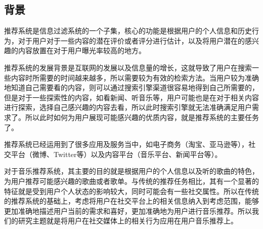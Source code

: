 \subsection{背景}
推荐系统是信息过滤系统的一个子集，核心的功能是根据用户的个人信息和历史行为，对于用户对于一些内容的潜在评价或者评分进行估计，以及将用户潜在的感兴趣的内容放置在对于用户曝光率较高的地方。

推荐系统的发展背景是互联网的发展以及信息量的增长，这就导致了用户在搜索一些内容时所需要的时间越来越多，所以需要较为有效的检索方法。当用户较为准确地知道自己需要看的内容，则可以通过搜索引擎渠道很容易地得到自己所需要的，但是对于一些探索性的内容，如看新闻、听音乐等，用户可能也是在对于相关内容进行探索，选择自己感兴趣的内容去看，所以此时搜索引擎就无法准确满足用户需求了。所以此时如何为用户展现可能感兴趣的优质内容，就是推荐系统的主要任务了。

推荐系统已经运用到了很多应用及服务当中，如电子商务（淘宝、亚马逊等），社交平台（微博、Twitter等）以及内容平台（音乐平台、新闻平台等）。

对于音乐推荐系统，其主要的目的就是根据用户的个人信息以及听的歌曲的特色，为用户推荐可能感兴趣的歌曲或者歌单。与传统的推荐任务相比，其有一个显著的特征就是受到用户个人状态的影响较大，同时可能会有一些社交属性。所以在传统的推荐系统的基础上，考虑将用户在社交平台上的相关信息纳入到考虑范围，能够更加准确地描述用户当前的需求和喜好，更加准确地为用户进行音乐推荐。所以我们的研究主题就是将用户在社交媒体上的相关行为应用在用户音乐推荐上。

